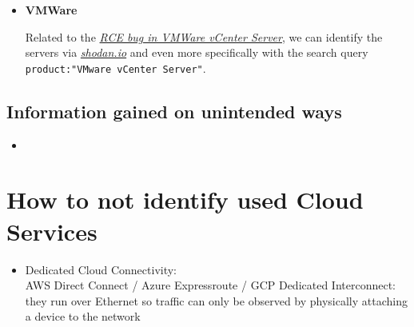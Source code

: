 \documentclass[12pt]{article}
\begin{document}
\begin{itemize}
    
    \item \textbf{VMWare}
    
    Related to the \href{https://thehackernews.com/2021/06/alert-critical-rce-bug-in-vmware.html?m=1}{\textit{RCE bug in VMWare vCenter Server}}, we can identify the servers via \href{https://www.shodan.io/search?query=vCenter+Server}{\textit{shodan.io}} and even more specifically with the search query \\ \verb|product:"VMware vCenter Server"|.
    

 
\end{itemize}

\subsection*{Information gained on unintended ways}
\begin{itemize}
    \item 
\end{itemize}


\newpage
\section*{How to not identify used Cloud Services}
\begin{itemize}
    \item Dedicated Cloud Connectivity: \\ AWS Direct Connect / Azure Expressroute / GCP Dedicated Interconnect: they run over Ethernet so traffic can only be observed by physically attaching a device to the network
\end{itemize}
\end{document}
